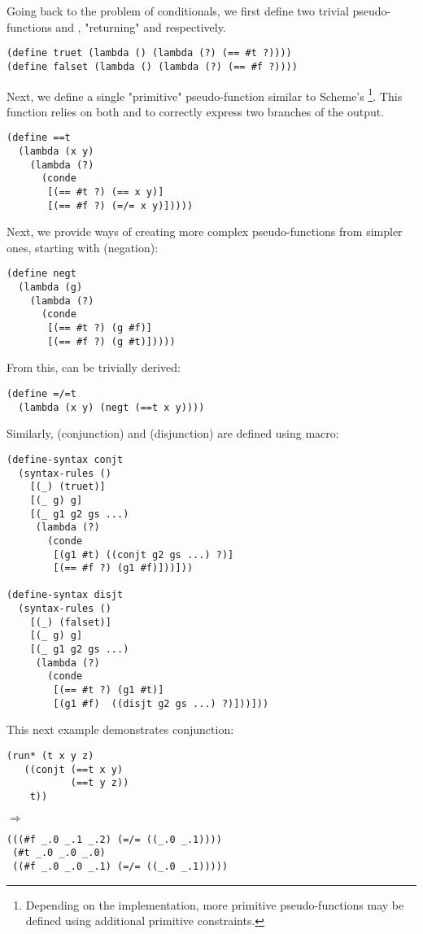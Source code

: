 Going back to the problem of conditionals, we first define two trivial pseudo-functions  and , "returning"  and  respectively.

\begin{lstlisting}
(define truet (lambda () (lambda (?) (== #t ?))))
(define falset (lambda () (lambda (?) (== #f ?))))
\end{lstlisting}

Next, we define a single "primitive" pseudo-function similar to Scheme's \footnote{Depending on the implementation, more primitive pseudo-functions may be defined using additional primitive constraints.}. This function relies on both \code{==} and \code{=/=} to correctly express two branches of the output.
\begin{lstlisting}
(define ==t
  (lambda (x y)
    (lambda (?)
      (conde
       [(== #t ?) (== x y)]
       [(== #f ?) (=/= x y)]))))
\end{lstlisting}

Next, we provide ways of creating more complex pseudo-functions from simpler ones, starting with  (negation):
\begin{lstlisting}
(define negt
  (lambda (g)
    (lambda (?)
      (conde
       [(== #t ?) (g #f)]
       [(== #f ?) (g #t)]))))
\end{lstlisting}

From this,  can be trivially derived:
\begin{lstlisting}
(define =/=t
  (lambda (x y) (negt (==t x y))))
\end{lstlisting}

Similarly,  (conjunction) and  (disjunction) are defined using macro:
\begin{lstlisting}
(define-syntax conjt
  (syntax-rules ()
    [(_) (truet)]
    [(_ g) g]
    [(_ g1 g2 gs ...)
     (lambda (?)
       (conde
        [(g1 #t) ((conjt g2 gs ...) ?)]
        [(== #f ?) (g1 #f)]))]))

(define-syntax disjt
  (syntax-rules ()
    [(_) (falset)]
    [(_ g) g]
    [(_ g1 g2 gs ...)
     (lambda (?)
       (conde
        [(== #t ?) (g1 #t)]
        [(g1 #f)  ((disjt g2 gs ...) ?)]))]))
\end{lstlisting}

This next example demonstrates conjunction:
\begin{lstlisting}
(run* (t x y z)
   ((conjt (==t x y)
           (==t y z))
    t))
\end{lstlisting}
$\Rightarrow$
\begin{lstlisting}
(((#f _.0 _.1 _.2) (=/= ((_.0 _.1))))
 (#t _.0 _.0 _.0)
 ((#f _.0 _.0 _.1) (=/= ((_.0 _.1)))))
\end{lstlisting}

